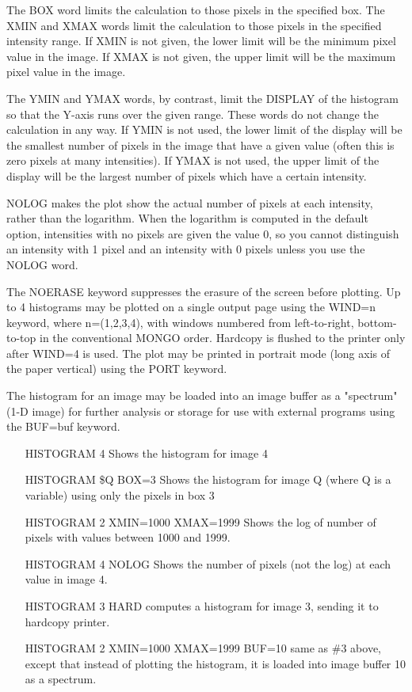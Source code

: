 The BOX word limits the calculation to those pixels in the specified box.
The XMIN and XMAX words limit the calculation to those pixels in the
specified intensity range.  If XMIN is not given, the lower limit will be
the minimum pixel value in the image.  If XMAX is not given, the upper
limit will be the maximum pixel value in the image.

The YMIN and YMAX words, by contrast, limit the DISPLAY of the histogram so
that the Y-axis runs over the given range.  These words do not change the
calculation in any way.  If YMIN is not used, the lower limit of the
display will be the smallest number of pixels in the image that have a
given value (often this is zero pixels at many intensities).  If YMAX is
not used, the upper limit of the display will be the largest number of
pixels which have a certain intensity.
       
NOLOG makes the plot show the actual number of pixels at each intensity,
rather than the logarithm.  When the logarithm is computed in the default
option, intensities with no pixels are given the value 0, so you cannot
distinguish an intensity with 1 pixel and an intensity with 0 pixels unless
you use the NOLOG word.

The NOERASE keyword suppresses the erasure of the screen before plotting.
Up to 4 histograms may be plotted on a single output page using the WIND=n
keyword, where n=(1,2,3,4), with windows numbered from left-to-right,
bottom-to-top in the conventional MONGO order.  Hardcopy is flushed to the
printer only after WIND=4 is used.  The plot may be printed in portrait
mode (long axis of the paper vertical) using the PORT keyword.

The histogram for an image may be loaded into an image buffer as a
"spectrum" (1-D image) for further analysis or storage for use with
external programs using the BUF=buf keyword.

\begin{itemize}
  \item[HISTOGRAM 4 \hfill]{Shows the histogram for image 4}
  \item[HISTOGRAM \$Q BOX=3 \hfill]{Shows the histogram for image Q 
       (where Q is a variable) using only the pixels in box 3}
  \item[HISTOGRAM 2 XMIN=1000 XMAX=1999 \hfill]{
       Shows the log of number of pixels with values between 1000 and 1999.}
  \item[HISTOGRAM 4 NOLOG \hfill]{
       Shows the number of pixels (not the log) at each value in image 4.}
  \item[HISTOGRAM 3 HARD\hfill]{
       computes a histogram for image 3, sending it to hardcopy printer.}
  \item[HISTOGRAM 2 XMIN=1000 XMAX=1999 BUF=10\hfill]{ same as \#3 above,
       except that instead of plotting the histogram, it is loaded into image
       buffer 10 as a spectrum.}
\end{itemize}

